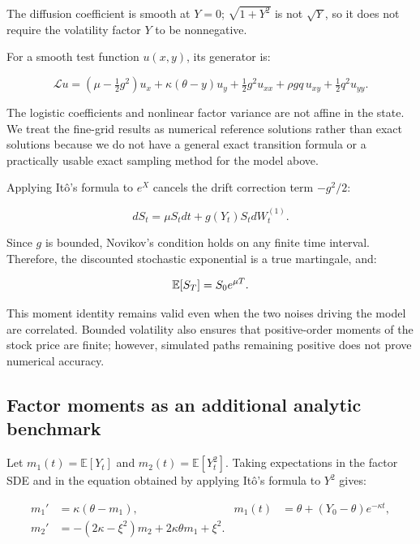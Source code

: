 The diffusion coefficient is smooth at $Y=0$; $\sqrt{1+Y^2}$ is not $\sqrt{Y}$, so it does not require the volatility factor $Y$ to be nonnegative.

For a smooth test function $u(x,y)$, its generator is:

\begin{equation}\label{eq:generator}
\mathcal Lu=(\mu-\tfrac12g^2)u_x+\kappa(\theta-y)u_y+\tfrac12g^2u_{xx}+\rho gq\,u_{xy}+\tfrac12q^2u_{yy}.
\end{equation}

The logistic coefficients and nonlinear factor variance are not affine in the state. We treat the fine-grid results as numerical reference solutions rather than exact solutions because we do not have a general exact transition formula or a practically usable exact sampling method for the model above.

Applying It\^o's formula to $e^X$ cancels the drift correction term $-g^2/2$:

\begin{equation}dS_t=\mu S_tdt+g(Y_t)S_tdW_t^{(1)}.
\end{equation}

Since $g$ is bounded, Novikov's condition holds on any finite time interval. Therefore, the discounted stochastic exponential is a true martingale, and:

\begin{equation}\label{eq:svmean}\mathbb E[S_T]=S_0e^{\mu T}.
\end{equation}

This moment identity remains valid even when the two noises driving the model are correlated. Bounded volatility also ensures that positive-order moments of the stock price are finite; however, simulated paths remaining positive does not prove numerical accuracy.

\subsection{Factor moments as an additional analytic benchmark}

Let $m_1(t)=\mathbb{E}[Y_t]$ and $m_2(t)=\mathbb{E}[Y_t^2]$. Taking expectations in the factor SDE and in the equation obtained by applying It\^o's formula to $Y^2$ gives:

\begin{align}
m_1'&=\kappa(\theta-m_1), &m_1(t)&=\theta+(Y_0-\theta)e^{-\kappa t},\\
m_2'&=-(2\kappa-\xi^2)m_2+2\kappa\theta m_1+\xi^2.
\end{align}

